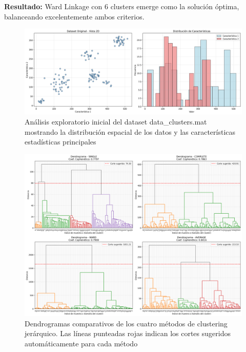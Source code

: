 \documentclass[12pt,a4paper]{article}
\begin{document}
\textbf{Resultado:} Ward Linkage con 6 clusters emerge como la solución óptima, balanceando excelentemente ambos criterios.

\begin{figure}[H]
    \centering
    \includegraphics[width=\textwidth]{figures/figura_01_dataset_original.png}
    \caption{Análisis exploratorio inicial del dataset data\_clusters.mat mostrando la distribución espacial de los datos y las características estadísticas principales}
    \label{fig:dataset_original}
\end{figure}

\begin{figure}[H]
    \centering
    \includegraphics[width=\textwidth]{figures/figura_02_dendrogramas_comparativos.png}
    \caption{Dendrogramas comparativos de los cuatro métodos de clustering jerárquico. Las líneas punteadas rojas indican los cortes sugeridos automáticamente para cada método}
    \label{fig:dendrogramas}
\end{figure}
\end{document}
